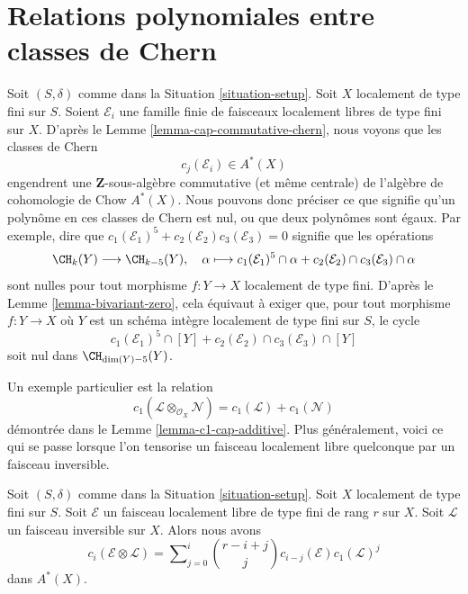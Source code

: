 \section{Relations polynomiales entre classes de Chern}
\label{section-relations-chern-classes}

\noindent
Soit $(S, \delta)$ comme dans la Situation \ref{situation-setup}. Soit $X$ localement
de type fini sur $S$. Soient $\mathcal{E}_i$ une famille finie de faisceaux
localement libres de type fini sur $X$. D'après le Lemme \ref{lemma-cap-commutative-chern},
nous voyons que les classes de Chern
$$
c_j(\mathcal{E}_i) \in A^*(X)
$$
engendrent une $\mathbf{Z}$-sous-algèbre commutative (et même centrale) de
l'algèbre de cohomologie de Chow $A^*(X)$.
Nous pouvons donc préciser ce que signifie qu'un polynôme en ces classes de Chern
est nul, ou que deux polynômes sont égaux. Par exemple, dire que
$c_1(\mathcal{E}_1)^5 + c_2(\mathcal{E}_2)c_3(\mathcal{E}_3) = 0$
signifie que les opérations
$$
\CH_k(Y) \longrightarrow \CH_{k - 5}(Y), \quad
\alpha \longmapsto
c_1(\mathcal{E}_1)^5 \cap \alpha +
c_2(\mathcal{E}_2) \cap c_3(\mathcal{E}_3) \cap \alpha
$$
sont nulles pour tout morphisme $f : Y \to X$ localement de type fini.
D'après le Lemme \ref{lemma-bivariant-zero},
cela équivaut à exiger que, pour tout morphisme
$f : Y \to X$  où $Y$ est un schéma intègre
localement de type fini sur $S$, le cycle
$$
c_1(\mathcal{E}_1)^5 \cap [Y] +
c_2(\mathcal{E}_2) \cap c_3(\mathcal{E}_3) \cap [Y]
$$
soit nul dans $\CH_{\dim(Y) - 5}(Y)$.

\medskip\noindent
Un exemple particulier est la relation
$$
c_1(\mathcal{L} \otimes_{\mathcal{O}_X} \mathcal{N})
=
c_1(\mathcal{L}) + c_1(\mathcal{N})
$$
démontrée dans le Lemme \ref{lemma-c1-cap-additive}.
Plus généralement, voici ce qui se passe lorsque l'on tensorise un
faisceau localement libre quelconque par un faisceau inversible.

\begin{lemma}
\label{lemma-chern-classes-E-tensor-L}
Soit $(S, \delta)$ comme dans la Situation \ref{situation-setup}.
Soit $X$ localement de type fini sur $S$.
Soit $\mathcal{E}$ un faisceau localement libre de type fini de
rang $r$ sur $X$. Soit $\mathcal{L}$ un faisceau inversible
sur $X$. Alors nous avons
\begin{equation}
\label{equation-twist}
c_i({\mathcal E} \otimes {\mathcal L})
=
\sum\nolimits_{j = 0}^i
\binom{r - i + j}{j} c_{i - j}({\mathcal E}) c_1({\mathcal L})^j
\end{equation}
dans $A^*(X)$.
\end{lemma}

